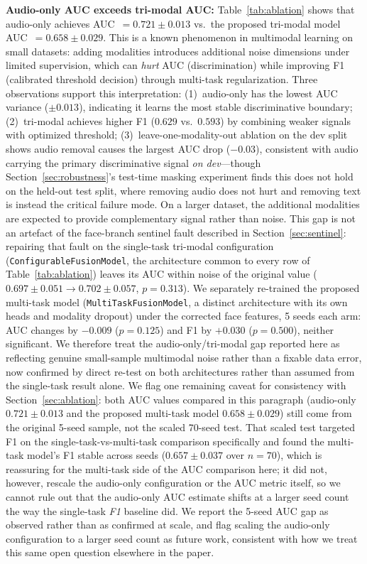 \documentclass[journal]{IEEEtran}
\begin{document}
\textbf{Audio-only AUC exceeds tri-modal AUC:} Table~\ref{tab:ablation}
shows that audio-only achieves AUC~$=0.721\pm0.013$ vs.\
the proposed tri-modal model AUC~$=0.658\pm0.029$. This is a known phenomenon
in multimodal learning on small datasets: adding modalities introduces
additional noise dimensions under limited supervision, which can
\emph{hurt} AUC (discrimination) while improving F1 (calibrated
threshold decision) through multi-task regularization. Three
observations support this interpretation: (1)~audio-only has the
lowest AUC variance ($\pm0.013$), indicating it learns the most
stable discriminative boundary; (2)~tri-modal achieves higher F1
($0.629$ vs.\ $0.593$) by combining weaker signals with optimized
threshold; (3)~leave-one-modality-out ablation on the dev split shows
audio removal causes the largest AUC drop ($-0.03$), consistent with
audio carrying the primary discriminative signal \emph{on dev}---though
Section~\ref{sec:robustness}'s test-time masking experiment finds this
does not hold on the held-out test split, where removing audio does
not hurt and removing text is instead the critical failure mode. On a
larger dataset, the additional modalities are expected to provide
complementary signal rather than noise. This gap is not an artefact of
the face-branch sentinel fault described in Section~\ref{sec:sentinel}:
repairing that fault on the single-task tri-modal configuration
(\texttt{ConfigurableFusionModel}, the architecture common to every row
of Table~\ref{tab:ablation}) leaves its AUC within noise of the
original value ($0.697\pm0.051\to0.702\pm0.057$, $p{=}0.313$). We
separately re-trained the proposed multi-task model
(\texttt{MultiTaskFusionModel}, a distinct architecture with its own
heads and modality dropout) under the corrected face features, 5 seeds
each arm: AUC changes by $-0.009$ ($p{=}0.125$) and F1 by $+0.030$
($p{=}0.500$), neither significant. We therefore treat the
audio-only/tri-modal gap reported here as reflecting genuine
small-sample multimodal noise rather than a fixable data error, now
confirmed by direct re-test on both architectures rather than assumed
from the single-task result alone. We flag one remaining caveat for
consistency with Section~\ref{sec:ablation}: both AUC values compared
in this paragraph (audio-only $0.721\pm0.013$ and the proposed
multi-task model $0.658\pm0.029$) still come from the original 5-seed
sample, not the scaled 70-seed test. That scaled test targeted F1 on
the single-task-vs-multi-task comparison specifically and found the
multi-task model's F1 stable across seeds ($0.657\pm0.037$ over
$n{=}70$), which is reassuring for the multi-task side of the AUC
comparison here; it did not, however, rescale the audio-only
configuration or the AUC metric itself, so we cannot rule out that
the audio-only AUC estimate shifts at a larger seed count the way the
single-task \emph{F1} baseline did. We report the 5-seed AUC gap as
observed rather than as confirmed at scale, and flag scaling the
audio-only configuration to a larger seed count as future work,
consistent with how we treat this same open question elsewhere in the
paper.
\end{document}
